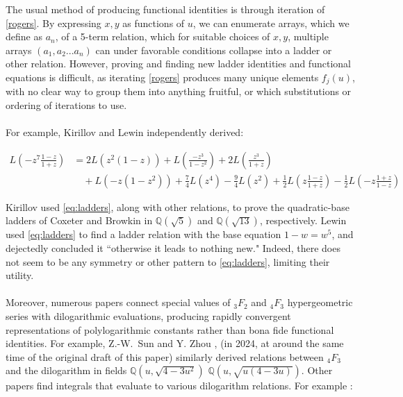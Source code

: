 \documentclass[12pt]{article}
\begin{document}
\noindent The usual method  of producing functional identities is through iteration of \eqref{rogers}.  By expressing $x,y$ as functions of $u$, we can enumerate arrays, which we define as $a_n$, of a 5-term relation, which for suitable choices of $x,y$, multiple arrays $(a_1,a_2...a_n)$ can under favorable conditions collapse into a ladder or other relation. However, proving and finding new ladder identities and functional equations is difficult, as iterating \eqref{rogers} produces many unique elements $f_j(u)$, with no clear way to group them into anything fruitful, or which substitutions or ordering of iterations to use. 
\\
\\
For example, Kirillov \cite{Kirillov1995} and Lewin \cite{Lewin1991text} independently derived:

\begin{equation}\label{eq:ladders}
\begin{aligned}
L\!\left(-z^7 \frac{1-z}{1+z}\right)
&= 2L\!\left(z^2(1-z)\right)
 + L\!\left(\frac{-z^3}{1-z^2}\right)
 + 2L\!\left(\frac{z^3}{1+z}\right) \\
&\quad + L\!\left(-z(1-z^2)\right)
 + \frac{7}{4}L(z^4)
 - \frac{9}{4}L(z^2)
 + \frac{1}{2}L\!\left(z\frac{1-z}{1+z}\right)
 - \frac{1}{2}L\!\left(-z\frac{1+z}{1-z}\right)
\end{aligned}
\end{equation}

\noindent 


\noindent Kirillov used \eqref{eq:ladders}, along with other relations, to prove the quadratic-base ladders of Coxeter and Browkin in
$\mathbb{Q}(\sqrt{5})$ and $\mathbb{Q}(\sqrt{13})$, respectively. Lewin used \eqref{eq:ladders} to find a ladder relation with the base equation $1-w=w^5$, and dejectedly concluded it ``otherwise it leads to nothing new." Indeed, there does not seem to be any symmetry or other pattern to \eqref{eq:ladders}, limiting their utility. 
\\
\\
Moreover, numerous papers connect special values of ${}_3F_2$ and ${}_4F_3$
hypergeometric series with dilogarithmic evaluations, producing rapidly convergent
representations of polylogarithmic constants rather than bona fide functional identities. For example, Z.-W.\ Sun and Y. Zhou \cite{SunZhoupreprint},  (in 2024, at around the same time of the original draft of this paper) similarly derived relations between ${}_4F_3$ and the dilogarithm in fields $\mathbb{Q}(u,\sqrt{4-3u^2})$ $\mathbb{Q}(u,\sqrt{u(4-3u)})$. Other papers find integrals that evaluate to various dilogarithm relations. For example \cite{BatirDasireddy}:
\end{document}
